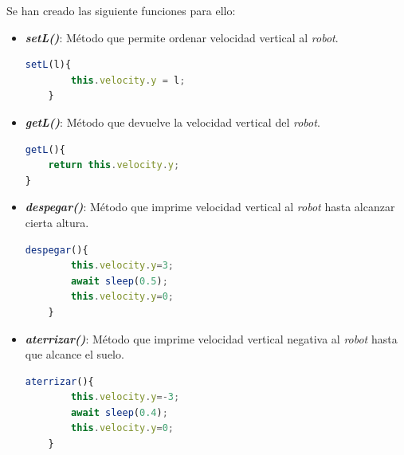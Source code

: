 Se han creado las siguiente funciones para ello:
\begin{itemize}
    \item \textit{\textbf{setL()}}: Método que permite ordenar velocidad vertical al \textit{robot}. 
    
    \begin{lstlisting}[language=javascript]
    setL(l){
        this.velocity.y = l;
    }
    \end{lstlisting}
    
    \item \textit{\textbf{getL()}}: Método que devuelve la velocidad vertical del \textit{robot}.
    
    \begin{lstlisting}[language=javascript]
getL(){
    return this.velocity.y;
}
    \end{lstlisting}
    
    \item \textit{\textit{\textbf{despegar()}}}: Método que imprime velocidad vertical al \textit{robot} hasta alcanzar cierta altura.
    
    \begin{lstlisting}[language=javascript]
    despegar(){
        this.velocity.y=3; 
        await sleep(0.5);
        this.velocity.y=0;
    }
    \end{lstlisting}
    
    \item \textit{\textbf{aterrizar()}}: Método que imprime velocidad vertical negativa al \textit{robot} hasta que alcance el suelo.
    
    \begin{lstlisting}[language=javascript]
    aterrizar(){
        this.velocity.y=-3;
        await sleep(0.4);
        this.velocity.y=0;
    }
    \end{lstlisting}
    
\end{itemize}

